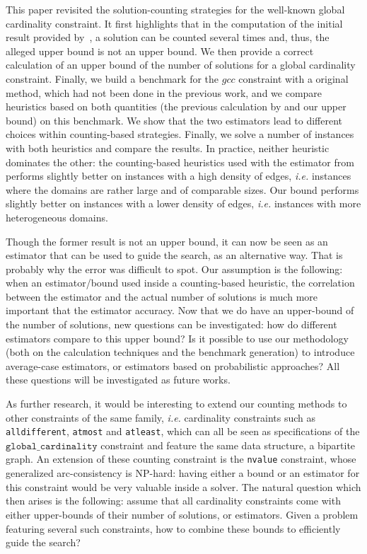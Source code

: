 

This paper revisited the solution-counting strategies for the well-known global cardinality constraint. It first highlights that in the computation of the initial result provided by~\cite{PesantQZ12}, a solution can be counted several times and, thus, the alleged upper bound is not an upper bound. We then provide a correct calculation of  an upper bound of the number of solutions for a global cardinality constraint. Finally, we build a benchmark for the $gcc$ constraint with a original method, which had not been done in the previous work, and we compare heuristics based on both quantities (the previous calculation by \cite{PesantQZ12} and our upper bound) on this benchmark. We  show that the two estimators lead to different choices within counting-based strategies. Finally, we solve a number of instances with both heuristics and compare the results. In practice, neither heuristic dominates the other: the counting-based heuristics used with the estimator from \cite{PesantQZ12} performs slightly better on instances with a high density of edges, \textit{i.e.} instances where the domains are rather large and of comparable sizes. Our bound performs slightly better on instances with a lower density of edges, \textit{i.e.} instances with more heterogeneous domains.

Though the former result is not an upper bound, it can now be seen as an estimator that can be used to guide the search, as an alternative way. That is probably why the error was difficult to spot. Our assumption is the following: when an estimator/bound used inside a counting-based heuristic, the correlation between the estimator and the actual number of solutions is much more important that the estimator accuracy. Now that we do have an upper-bound of the number of solutions, new questions can be investigated: how do different estimators compare to this upper bound? Is it possible to use our methodology (both on the calculation techniques and the benchmark generation) to introduce average-case estimators, or estimators based on probabilistic approaches? All these questions will be investigated as future works.

As further research, it would be interesting to extend our counting methods to other constraints of the same family, \textit{i.e.} cardinality constraints such as \texttt{alldifferent}, \texttt{atmost} and \texttt{atleast}, which can all be seen as specifications of the $\texttt{global\_cardinality}$ constraint and feature the same data structure, a bipartite graph. An extension of these counting constraint is the \texttt{nvalue} constraint, whose generalized arc-consistency is NP-hard: having either a bound or an estimator for this constraint would be very valuable inside a solver. The natural question which then arises is the following: assume that all cardinality constraints come with either upper-bounds of their number of solutions, or estimators. Given a problem featuring several such constraints, how to combine these bounds to efficiently guide the search? 


